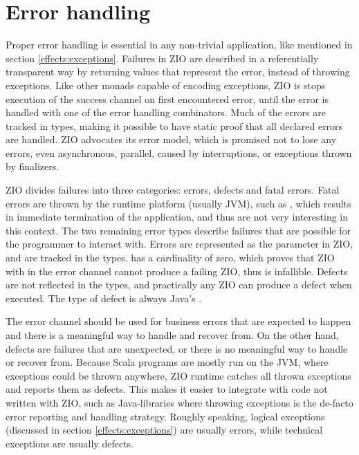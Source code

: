 


\section{Error handling} \label{zio:error-handling}
Proper error handling is essential in any non-trivial application, like mentioned in section \ref{effects:exceptions}. Failures in ZIO are described in a referentially transparent way by returning values that represent the error, instead of throwing exceptions. Like other monads capable of encoding exceptions, ZIO is stops execution of the success channel on first encountered error, until the error is handled with one of the error handling combinators. Much of the errors are tracked in types, making it possible to have static proof that all declared errors are handled. ZIO advocates its error model, which is promised not to lose any errors, even asynchronous, parallel, caused by interruptions, or exceptions thrown by finalizers.

ZIO divides failures into three categories: errors, defects and fatal errors. Fatal errors are thrown by the runtime platform (usually JVM), such as , which results in immediate termination of the application, and thus are not very interesting in this context. The two remaining error types describe failures that are possible for the programmer to interact with. Errors are represented as the  parameter in ZIO, and are tracked in the types.  has a cardinality of zero, which proves that ZIO with  in the error channel cannot produce a failing ZIO, thus is infallible. Defects are not reflected in the types, and practically any ZIO can produce a defect when executed. The type of defect is always Java's .

The error channel should be used for business errors that are expected to happen and there is a meaningful way to handle and recover from. On the other hand, defects are failures that are unexpected, or there is no meaningful way to handle or recover from. Because Scala programs are mostly run on the JVM, where exceptions could be thrown anywhere, ZIO runtime catches all thrown exceptions and reports them as defects. This makes it easier to integrate with code not written with ZIO, such as Java-libraries where throwing exceptions is the de-facto error reporting and handling strategy. Roughly speaking, logical exceptions (discussed in section \ref{effects:exceptions}) are usually errors, while technical exceptions are usually defects.

